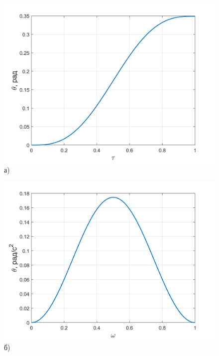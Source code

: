 \begin{figure}[h!]
	\begin{minipage}[b]{0.49\linewidth}\centering
		\includegraphics[width=\linewidth]{matlab/img/theta_sin} \\а)  
	\end{minipage}
	\hfill
	\begin{minipage}[b]{0.49\linewidth}\centering
		\includegraphics[width=\linewidth]{matlab/img/omega_sin} \\б)  
	\end{minipage}
	
	\vspace{0.5em} %
	

\end{figure}
